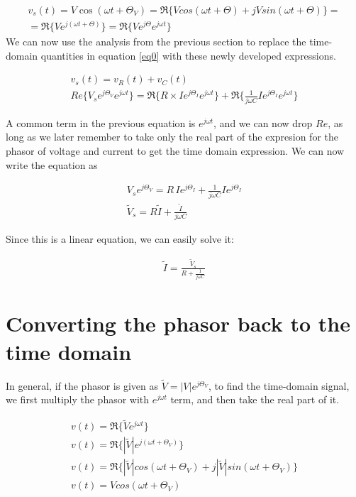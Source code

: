 \documentclass{ximera}
\begin{document}
\begin{eqnarray}
v_s(t)=  V \cos (\omega t + \Theta_V)=\Re\{ V cos (\omega t + \Theta ) + j V sin (\omega t + \Theta)\}= \nonumber \\ 
= \Re\{V e^{j(\omega t + \Theta)}\}=\Re\{V e^{j \Theta} e^{j \omega t}\} \label{eq2}
\end{eqnarray}
We can now use the analysis from the previous section to  replace the time-domain quantities in equation \ref{eq0} with
these newly developed expressions.



\begin{eqnarray}
v_s(t)=v_R(t) + v_C(t)  \\
Re\{V_s e^{j \Theta_V} e^{j \omega t}\}=    \Re\{R \times I e^{j \Theta_I} e^{j \omega t}\}   +  \Re\{   \frac{1}{j \omega C}  I e^{j \Theta_I}  e^{j \omega t}  \}
\end{eqnarray}

A common term in the previous equation is $ e^{j\omega t}$, and we can now drop $Re$, as long as we later remember to take only the real part of the expresion for the phasor of voltage and current to get the time domain expression. We can now
write the equation as




\begin{eqnarray}
 V_s  e^{j \Theta_{V}}  =R \, I e^{j \Theta_I}  +    \frac{1}{j \omega C}  I e^{j \Theta_I}  \\
\tilde{V}_s  = R \tilde{I}    + \frac{\tilde{I}}{j \omega C} 
\end{eqnarray}



Since this is a linear equation, we can easily solve it:


\begin{eqnarray}
\tilde{I}  = \frac{\tilde{V}_s}{ R    + \frac{1}{j \omega C} } \label{pheq}
\end{eqnarray} 




\section{Converting the phasor back to the time domain}


In general, if the phasor is given as $\tilde{V}=|V| e^{j \Theta_V}$, to find the time-domain signal, we first multiply the phasor with $e^{j \omega t}$ term, and then take the real part of it. 

\begin{eqnarray}
v(t)=\Re \{ \tilde{V} e^{j \omega t} \} \\
v(t)=\Re\{|\tilde{V}| e^{j(\omega t + \Theta_V)}\} \\
v(t)=\Re\{ |\tilde{V}| cos (\omega t + \Theta_V ) + j  |\tilde{V}|  sin (\omega t + \Theta_V)\} \\
v(t) = V cos (\omega t + \Theta_V )
\end{eqnarray}
\end{document}

